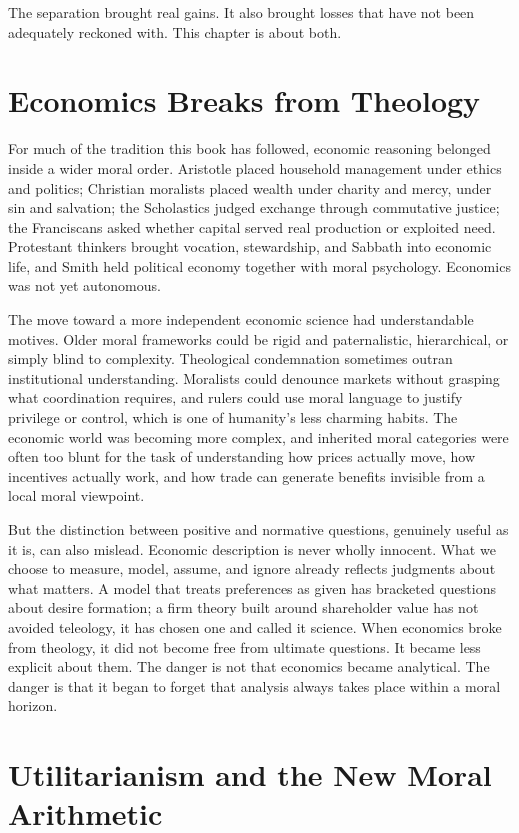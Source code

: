 \documentclass[11pt,a4paper,oneside]{book}
\begin{document}
The separation brought real gains. It also brought losses that have not been adequately reckoned with. This chapter is about both.

\section*{Economics Breaks from Theology}

For much of the tradition this book has followed, economic reasoning belonged inside a wider moral order. Aristotle placed household management under ethics and politics; Christian moralists placed wealth under charity and mercy, under sin and salvation; the Scholastics judged exchange through commutative justice; the Franciscans asked whether capital served real production or exploited need. Protestant thinkers brought vocation, stewardship, and Sabbath into economic life, and Smith held political economy together with moral psychology. Economics was not yet autonomous.

The move toward a more independent economic science had understandable motives. Older moral frameworks could be rigid and paternalistic, hierarchical, or simply blind to complexity. Theological condemnation sometimes outran institutional understanding. Moralists could denounce markets without grasping what coordination requires, and rulers could use moral language to justify privilege or control, which is one of humanity's less charming habits. The economic world was becoming more complex, and inherited moral categories were often too blunt for the task of understanding how prices actually move, how incentives actually work, and how trade can generate benefits invisible from a local moral viewpoint.

But the distinction between positive and normative questions, genuinely useful as it is, can also mislead. Economic description is never wholly innocent. What we choose to measure, model, assume, and ignore already reflects judgments about what matters. A model that treats preferences as given has bracketed questions about desire formation; a firm theory built around shareholder value has not avoided teleology, it has chosen one and called it science. When economics broke from theology, it did not become free from ultimate questions. It became less explicit about them. The danger is not that economics became analytical. The danger is that it began to forget that analysis always takes place within a moral horizon.

\section*{Utilitarianism and the New Moral Arithmetic}
\end{document}

